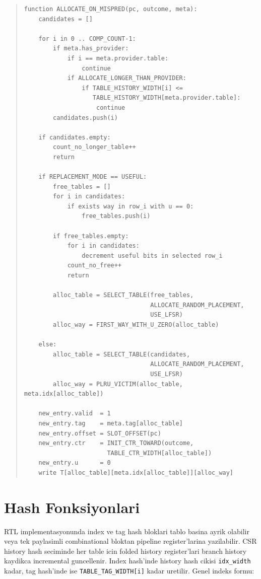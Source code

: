 \documentclass[11pt,a4paper]{article}
\newcommand{\code}[1]{\texttt{#1}}
\newcommand{\param}[1]{\texttt{#1}}
\begin{document}
\begin{quote}
\footnotesize
\begin{verbatim}
function ALLOCATE_ON_MISPRED(pc, outcome, meta):
    candidates = []

    for i in 0 .. COMP_COUNT-1:
        if meta.has_provider:
            if i == meta.provider.table:
                continue
            if ALLOCATE_LONGER_THAN_PROVIDER:
                if TABLE_HISTORY_WIDTH[i] <=
                   TABLE_HISTORY_WIDTH[meta.provider.table]:
                    continue
        candidates.push(i)

    if candidates.empty:
        count_no_longer_table++
        return

    if REPLACEMENT_MODE == USEFUL:
        free_tables = []
        for i in candidates:
            if exists way in row_i with u == 0:
                free_tables.push(i)

        if free_tables.empty:
            for i in candidates:
                decrement useful bits in selected row_i
            count_no_free++
            return

        alloc_table = SELECT_TABLE(free_tables,
                                   ALLOCATE_RANDOM_PLACEMENT,
                                   USE_LFSR)
        alloc_way = FIRST_WAY_WITH_U_ZERO(alloc_table)

    else:
        alloc_table = SELECT_TABLE(candidates,
                                   ALLOCATE_RANDOM_PLACEMENT,
                                   USE_LFSR)
        alloc_way = PLRU_VICTIM(alloc_table, meta.idx[alloc_table])

    new_entry.valid  = 1
    new_entry.tag    = meta.tag[alloc_table]
    new_entry.offset = SLOT_OFFSET(pc)
    new_entry.ctr    = INIT_CTR_TOWARD(outcome,
                       TABLE_CTR_WIDTH[alloc_table])
    new_entry.u      = 0
    write T[alloc_table][meta.idx[alloc_table]][alloc_way]
\end{verbatim}
\end{quote}

\section{Hash Fonksiyonlari}

RTL implementasyonunda index ve tag hash bloklari tablo basina ayrik olabilir
veya tek paylasimli combinational bloktan pipeline register'larina yazilabilir.
CSR history hash seciminde her table icin folded history register'lari branch
history kaydikca incremental guncellenir. Index hash'inde history hash cikisi
\code{idx\_width} kadar, tag hash'inde ise \param{TABLE\_TAG\_WIDTH[i]} kadar
uretilir. Genel indeks formu:
\end{document}
